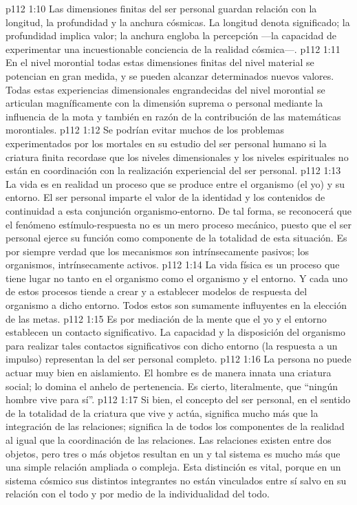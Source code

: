 \vs p112 1:10 Las dimensiones finitas del ser personal guardan relación con la longitud, la profundidad y la anchura cósmicas. La longitud denota significado; la profundidad implica valor; la anchura engloba la percepción ---la capacidad de experimentar una incuestionable conciencia de la realidad cósmica---.
\vs p112 1:11 En el nivel morontial todas estas dimensiones finitas del nivel material se potencian en gran medida, y se pueden alcanzar determinados nuevos valores. Todas estas experiencias dimensionales engrandecidas del nivel morontial se articulan magníficamente con la dimensión suprema o personal mediante la influencia de la mota y también en razón de la contribución de las matemáticas morontiales.
\vs p112 1:12 Se podrían evitar muchos de los problemas experimentados por los mortales en su estudio del ser personal humano si la criatura finita recordase que los niveles dimensionales y los niveles espirituales no están en coordinación con la realización experiencial del ser personal.
\vs p112 1:13 \pc La vida es en realidad un proceso que se produce entre el organismo (el yo) y su entorno. El ser personal imparte el valor de la identidad y los contenidos de continuidad a esta conjunción organismo\hyp{}entorno. De tal forma, se reconocerá que el fenómeno estímulo\hyp{}respuesta no es un mero proceso mecánico, puesto que el ser personal ejerce su función como componente de la totalidad de esta situación. Es por siempre verdad que los mecanismos son intrínsecamente pasivos; los organismos, intrínsecamente activos.
\vs p112 1:14 La vida física es un proceso que tiene lugar no tanto en el organismo como  el organismo y el entorno. Y cada uno de estos procesos tiende a crear y a establecer modelos de respuesta del organismo a dicho entorno. Todos estos  son sumamente influyentes en la elección de las metas.
\vs p112 1:15 Es por mediación de la mente que el yo y el entorno establecen un contacto significativo. La capacidad y la disposición del organismo para realizar tales contactos significativos con dicho entorno (la respuesta a un impulso) representan la  del ser personal completo.
\vs p112 1:16 La persona no puede actuar muy bien en aislamiento. El hombre es de manera innata una criatura social; lo domina el anhelo de pertenencia. Es cierto, literalmente, que “ningún hombre vive para sí”.
\vs p112 1:17 Si bien, el concepto del ser personal, en el sentido de la totalidad de la criatura que vive y actúa, significa mucho más que la integración de las relaciones; significa la  de todos los componentes de la realidad al igual que la coordinación de las relaciones. Las relaciones existen entre dos objetos, pero tres o más objetos resultan en un  y tal sistema es mucho más que una simple relación ampliada o compleja. Esta distinción es vital, porque en un sistema cósmico sus distintos integrantes no están vinculados entre sí salvo en su relación con el todo y por medio de la individualidad del todo.
